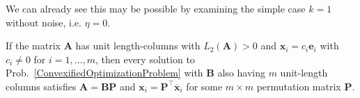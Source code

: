 We can already see this may be possible by examining the simple case $k=1$ without noise, i.e. $\eta = 0$.

\begin{proposition}
If the matrix $\mathbf{A}$ has unit length-columns with $L_2(\mathbf{A}) > 0$ and $\mathbf{x}_i = c_i\mathbf{e}_i$ with $c_i \neq 0$ for $i = 1, \ldots, m$, then every solution to Prob.~\ref{ConvexifiedOptimizationProblem} with $\mathbf{B}$ also having $m$ unit-length columns satisfies $\mathbf{A} = \mathbf{BP}$ and $\mathbf{x}_i = \mathbf{P}^\top \mathbf{\overline x}_i$ for some $m \times m$ permutation matrix $\mathbf{P}$.
\end{proposition}

